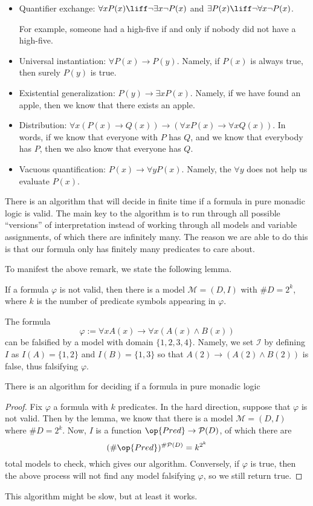 \begin{itemize}
	\item Quantifier exchange: $\forall xP(x)\liff\lnot\exists x\lnot P(x)$ and $\exists P(x)\liff\lnot\forall x\lnot P(x)$.

	For example, someone had a high-five if and only if nobody did not have a high-five.

	\item Universal instantiation: $\forall P(x)\to P(y)$. Namely, if $P(x)$ is always true, then surely $P(y)$ is true.

	\item Existential generalization: $P(y)\to\exists xP(x)$. Namely, if we have found an apple, then we know that there exists an apple.

	\item Distribution: $\forall x(P(x)\to Q(x))\to(\forall xP(x)\to\forall xQ(x))$. In words, if we know that everyone with $P$ has $Q$, and we know that everybody has $P$, then we also know that everyone has $Q$.

	\item Vacuous quantification: $P(x)\to\forall yP(x)$. Namely, the $\forall y$ does not help us evaluate $P(x)$.
\end{itemize}
\begin{remark}
	There is an algorithm that will decide in finite time if a formula in pure monadic logic is valid. The main key to the algorithm is to run through all possible ``versions'' of interpretation instead of working through all models and variable assignments, of which there are infinitely many. The reason we are able to do this is that our formula only has finitely many predicates to care about.
\end{remark}
To manifest the above remark, we state the following lemma.
\begin{lemma}
	If a formula $\varphi$ is not valid, then there is a model $\mathcal M=(D,I)$ with $\#D=2^k$, where $k$ is the number of predicate symbols appearing in $\varphi$.
\end{lemma}
\begin{example}
	The formula
	\[\varphi:=\forall xA(x)\to\forall x(A(x)\land B(x))\]
	can be falsified by a model with domain $\{1,2,3,4\}$. Namely, we set $\mathcal I$ by defining $I$ as $I(A)=\{1,2\}$ and $I(B)=\{1,3\}$ so that $A(2)\to(A(2)\land B(2))$ is false, thus falsifying $\varphi$.
\end{example}
\begin{corollary}
	There is an algorithm for deciding if a formula in pure monadic logic
\end{corollary}
\begin{proof}
	Fix $\varphi$ a formula with $k$ predicates. In the hard direction, suppose that $\varphi$ is not valid. Then by the lemma, we know that there is a model $\mathcal M=(D,I)$ where $\#D=2^k$. Now, $I$ is a function $\op{Pred}\to\mathcal P(D)$, of which there are
	\[(\#\op{Pred})^{\#\mathcal P(D)}=k^{2^k}\]
	total models to check, which gives our algorithm. Conversely, if $\varphi$ is true, then the above process will not find any model falsifying $\varphi$, so we still return true.
\end{proof}
This algorithm might be slow, but at least it works.